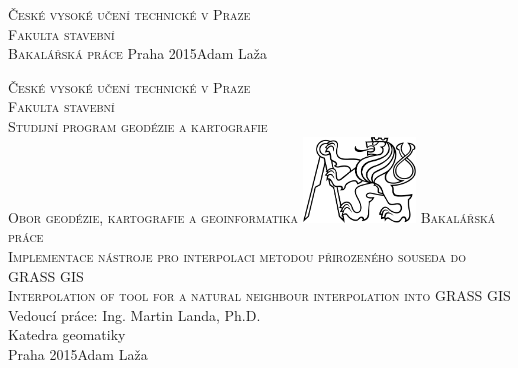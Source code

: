 \begin{center}
\newcommand{\napisCVUT}{České vysoké učení technické v Praze}
\newcommand{\napisFS}{Fakulta stavební}
\newcommand{\napisProgram}{Studijní program geodézie a kartografie}
\newcommand{\napisObor}{Obor geodézie, kartografie a geoinformatika}
\newcommand{\napisKatedra}{Katedra geomatiky}
\newcommand{\napisVedouci}{Vedoucí práce: Ing. Martin Landa, Ph.D.}
\newcommand{\napisAutor}{Adam Laža}
\newcommand{\napisDatum}{Praha 2015}
\newcommand{\napisNazevI}{Implementace nástroje pro interpolaci metodou přirozeného souseda do GRASS GIS}
\newcommand{\napisNazevAjI}{Interpolation of tool for a natural neighbour interpolation into GRASS GIS}
\newcommand{\napisBakalarka}{Bakalářská práce}
\newcommand{\napisPraha}{Praha 2015}
%
\newcommand{\velka}[1]{\textsc{#1}}
%
% 
\newif\ifpatitul
\patitultrue

\ifpatitul
{\Large\velka{\napisCVUT}}\\
\velka{\Large\napisFS}\\
\vfill
{\LARGE\velka{\napisBakalarka}}
\vfill
{\large\napisPraha\hfill\napisAutor}
\newpage
\fi%


{\Large\velka{\napisCVUT}}\\
{\Large\velka{\napisFS}}\\
{\Large\velka{\napisProgram}}\\
{\Large\velka{\napisObor}}
\vfill
\includegraphics[width=3cm]{logo_cvut_cb} %
\vfill
{\Large\velka{\napisBakalarka}}\\
\Large\velka{\napisNazevI}\\
\large\velka{\napisNazevAjI}
\vfill
{\large%
\napisVedouci\\
\napisKatedra\\
\bigskip
\napisDatum\hfill\napisAutor}
\end{center}
